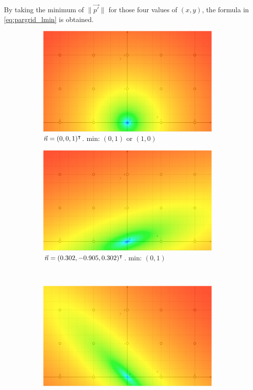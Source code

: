 By taking the minimum of $\| \vec{p'} \|$ for those four values of $(x, y)$, the formula in \ref{eq:pargrid_lmin} is obtained.

\begin{figure}[h]
\begin{subfigure}{.49\textwidth}
	\includegraphics[width=\linewidth]{fig/lmin/0-0-1.pdf}
	\caption{$\vec{n} = (0, 0, 1)^\intercal$. min: $(0, 1)$ or $(1, 0)$}
\end{subfigure}%
\begin{subfigure}{.49\textwidth}
	\includegraphics[width=\linewidth]{fig/lmin/1--3-1.pdf}
	\caption{$\vec{n} = (0.302, -0.905, 0.302)^\intercal$. min: $(0, 1)$}
\end{subfigure}\\
\begin{subfigure}{.49\textwidth}
	\includegraphics[width=\linewidth]{fig/lmin/3-3-1.pdf}

\end{subfigure}
\end{figure}
